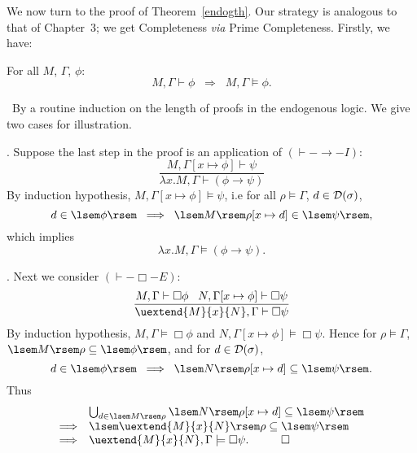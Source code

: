 We now turn to the proof of Theorem~\ref{endogth}.
Our strategy is analogous to that of Chapter~3; we get Completeness {\it via} Prime Completeness.
Firstly, we have:
\begin{theorem}[Soundness]
\label{endogsoun}
For all $M$, $\Gamma$, $\phi$:
\[ M, \Gamma \vdash \phi \;\; \Longrightarrow \;\; M, \Gamma \models \phi . \]
\end{theorem}

\proof\ By a routine induction on the length of proofs in the endogenous logic.
We give two cases for illustration.

. Suppose the last step in the proof is an application of $({\vdash}-{\rightarrow}-I)$:
\[ \frac{M, \Gamma [x \mapsto \phi ] \vdash \psi}{\lambda x . M, \Gamma \vdash (\phi \rightarrow \psi )} \]
By induction hypothesis, $M, \Gamma [x \mapsto \phi ] \models \psi$, i.e for all $\rho \models \Gamma$, $d \in {\cal D}(\sigma )$, 
\[  d \in \lsem \phi \rsem \;\; \Longrightarrow \;\; \lsem M \rsem \rho [x \mapsto d] \in \lsem \psi \rsem , \]
which implies
\[ \lambda x . M, \Gamma \models (\phi \rightarrow \psi ) . \]

. Next we consider $({\vdash}-{\Box}-E)$:
\[ \frac{M, \Gamma \vdash \Box \phi \;\;\; N, \Gamma [x \mapsto \phi ] \vdash \Box \psi}{\uextend{M}{x}{N}, \Gamma \vdash \Box \psi} \]
By induction hypothesis, $M, \Gamma \models \Box \phi$ and $N, \Gamma [x \mapsto \phi ] \models \Box \psi$.
Hence for $\rho \models \Gamma$, $\lsem M \rsem \rho \subseteq \lsem \phi \rsem$,
and for $d \in {\cal D}(\sigma )$,
\[ d \in \lsem \phi \rsem \;\; \Longrightarrow \;\; \lsem N \rsem \rho [x \mapsto d] \subseteq \lsem \psi \rsem . \]
Thus
\[ \begin{array}{ll}
& \bigcup_{d \in \lsem M \rsem \rho} \lsem N \rsem \rho [x \mapsto d] \subseteq \lsem \psi \rsem \\
\Longrightarrow & \lsem \uextend{M}{x}{N} \rsem \rho \subseteq \lsem \psi \rsem \\
\Longrightarrow & \uextend{M}{x}{N}, \Gamma \models \Box \psi . \;\;\; \qed
\end{array} \]

